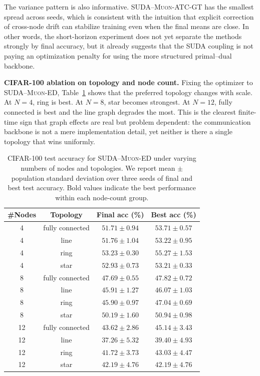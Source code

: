 \documentclass{article}
\begin{document}
The variance pattern is also informative. \textsc{SUDA--Muon-ATC-GT} has the
smallest spread across seeds, which is consistent with the intuition that
explicit correction of cross-node drift can stabilize training even when the
final means are close. In other words, the short-horizon experiment does not
yet separate the methods strongly by final accuracy, but it already suggests
that the SUDA coupling is not paying an optimization penalty for using the more
structured primal--dual backbone.



\textbf{CIFAR-100 ablation on topology and node count.}
Fixing the optimizer to \textsc{SUDA--Muon-ED}, Table~\ref{tab:cifar-ablation}
shows that the preferred topology changes with scale. At $N=4$, ring is best.
At $N=8$, star becomes strongest. At $N=12$, fully connected is best and the
line graph degrades the most. This is the clearest finite-time sign that graph
effects are real but problem dependent: the communication backbone is not a
mere implementation detail, yet neither is there a single topology that wins
uniformly.


\begin{table}[t!]
    \centering
    \caption{CIFAR-100 test accuracy for \textsc{SUDA--Muon-ED} under varying
    numbers of nodes and topologies. We report mean $\pm$ population standard
    deviation over three seeds of final and best test accuracy. Bold values
    indicate the best performance within each node-count group.}
    \label{tab:cifar-ablation}
    \begin{tabular}{cccc}
        \toprule
        \#Nodes & Topology & Final acc (\%) & Best acc (\%) \\
        \midrule
        4  & fully connected & $51.71 \pm 0.94$ & $53.71 \pm 0.57$ \\
        4  & line            & $51.76 \pm 1.04$ & $53.22 \pm 0.95$ \\
        4  & ring            & $\mathbf{53.23 \pm 0.30}$ & $\mathbf{55.27 \pm 1.53}$ \\
        4  & star            & $52.93 \pm 0.73$ & $53.21 \pm 0.33$ \\
        \midrule
        8  & fully connected & $47.69 \pm 0.55$ & $47.82 \pm 0.72$ \\
        8  & line            & $45.91 \pm 1.27$ & $46.07 \pm 1.03$ \\
        8  & ring            & $45.90 \pm 0.97$ & $47.04 \pm 0.69$ \\
        8  & star            & $\mathbf{50.19 \pm 1.60}$ & $\mathbf{50.94 \pm 0.98}$ \\
        \midrule
        12 & fully connected & $\mathbf{43.62 \pm 2.86}$ & $\mathbf{45.14 \pm 3.43}$ \\
        12 & line            & $37.26 \pm 5.32$ & $39.40 \pm 4.93$ \\
        12 & ring            & $41.72 \pm 3.73$ & $43.03 \pm 4.47$ \\
        12 & star            & $42.19 \pm 4.76$ & $42.19 \pm 4.76$ \\
        \bottomrule
    \end{tabular}
\end{table}
\end{document}
